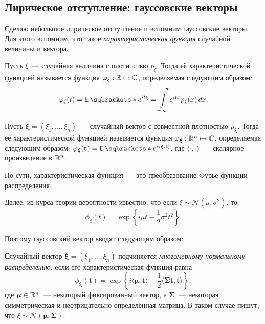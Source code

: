 \subsection{Лирическое отступление: гауссовские векторы}
Сделаю небольшое лирическое отступление и вспомним гауссовские векторы. Для 
этого вспомним, что такое \emph{характеристическая функция} случайной величины 
и вектора.
\begin{definition}
	Пусть \(\xi\)~--- случайная величина с плотностью \(p_{\xi}\). Тогда её 
	характеристической функцией называется функция \(\varphi_{\xi} : \mathbb{R} \mapsto 
	\mathbb{C}\), определяемая следующим образом:
	\[
	\phi_{\xi}(t) = \E{e^{it\xi}} = \int\limits_{-\infty}^{+\infty} 
	e^{itx}p_{\xi}(x)\diff x.
	\]
\end{definition}
\begin{definition}
	Пусть \(\bm{\xi} = (\xi_{1}, \dots, \xi_{n})\)~--- случайный вектор с 
	совместной плотностью \(p_{\bm{\xi}}\). Тогда её характеристической 
	функцией называется функция \(\varphi_{\bm{\xi}} : \mathbb{R}^{n} \mapsto \mathbb{C}\), 
	определяемая следующим образом: \(\phi_{\bm{\xi}}(\mathbf{t}) = 
	\E{e^{i\langle\bm{\xi}, \mathbf{t}\rangle}}\), где \(\langle\cdot, 
	\cdot\rangle\)~--- скалярное произведение в \(\mathbb{R}^{n}\).
\end{definition}

По сути, характеристическая функция~--- это преобразование Фурье функции 
распределения.

Далее, из курса теории вероятности известно, что если \(\xi \sim 
\mathcal{N}(\mu, \sigma^{2})\), то
\[
\phi_{\xi}(t) = \exp\left\{i \mu t - \frac{1}{2}\sigma^{2}t^{2}\right\}.
\]

Поэтому гауссовский вектор вводят следующим образом:
\begin{definition}
	Случайный вектор \(\bm{\xi} = (\xi_{1}, \dots, \xi_{n})\) подчиняется 
	\emph{многомерному нормальному распределению}, если его характеристическая 
	функция равна
	\[
	\phi_{\bm{\xi}}(\mathbf{t}) = \exp\left\{i\langle\bm{\mu}, 
	\mathbf{t}\rangle - \frac{1}{2}\langle\mathbf{\Sigma t}, 
	\mathbf{t}\rangle\right\},
	\]
	где \(\bm{\mu} \in \mathbb{R}^{n}\)~--- некоторый фиксированный вектор, а 
	\(\mathbf{\Sigma}\)~--- некоторая симметрическая и неотрицательно 
	определённая матрица. В таком случае пишут, что \(\xi \sim 
	\mathcal{N}(\bm{\mu}, \mathbf{\Sigma})\).
\end{definition}

